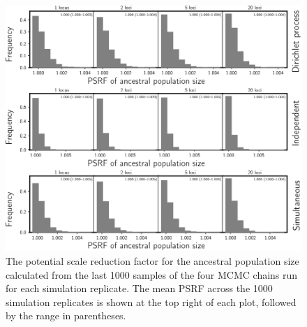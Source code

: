 \begin{figure}[htbp]
    \begin{center}
        \includegraphics[width=\textwidth,height=0.9\textheight,keepaspectratio]{../images/from-project-repo/plots/tex-plot-grids/grid-psrf-root-pop-size-histograms-cropped.pdf}
        \caption{
            The potential scale reduction factor \citep[PSRF; the square root
            of Equation 1.1 in][]{Brooks1998}
            for the ancestral population size calculated from the last 1000
            samples of the four MCMC chains run for each simulation replicate.
            The mean PSRF across the 1000 simulation replicates is shown at the
            top right of each plot, followed by the range in parentheses.
        }
        \label{fig:psrfrootpopsize}
    \end{center}
\end{figure}

